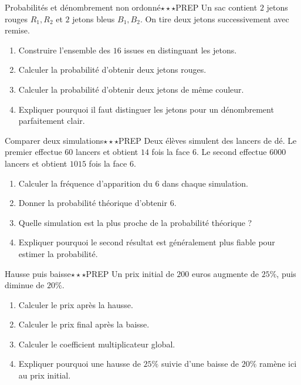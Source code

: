 \documentclass[11pt,a4paper]{article}
\newcounter{exo}
\begin{document}
\begin{exobox}{Probabilités et dénombrement non ordonné}{$\star\star\star$}{PREP}
Un sac contient $2$ jetons rouges $R_1,R_2$ et $2$ jetons bleus $B_1,B_2$. On tire deux jetons successivement avec remise.
\begin{enumerate}
\item Construire l'ensemble des $16$ issues en distinguant les jetons.
\item Calculer la probabilité d'obtenir deux jetons rouges.
\item Calculer la probabilité d'obtenir deux jetons de même couleur.
\item Expliquer pourquoi il faut distinguer les jetons pour un dénombrement parfaitement clair.
\end{enumerate}
\end{exobox}

\begin{exobox}{Comparer deux simulations}{$\star\star\star$}{PREP}
Deux élèves simulent des lancers de dé. Le premier effectue $60$ lancers et obtient $14$ fois la face $6$. Le second effectue $6000$ lancers et obtient $1015$ fois la face $6$.
\begin{enumerate}
\item Calculer la fréquence d'apparition du $6$ dans chaque simulation.
\item Donner la probabilité théorique d'obtenir $6$.
\item Quelle simulation est la plus proche de la probabilité théorique ?
\item Expliquer pourquoi le second résultat est généralement plus fiable pour estimer la probabilité.
\end{enumerate}
\end{exobox}

\begin{exobox}{Hausse puis baisse}{$\star\star\star$}{PREP}
Un prix initial de $200$ euros augmente de $25\%$, puis diminue de $20\%$.
\begin{enumerate}
\item Calculer le prix après la hausse.
\item Calculer le prix final après la baisse.
\item Calculer le coefficient multiplicateur global.
\item Expliquer pourquoi une hausse de $25\%$ suivie d'une baisse de $20\%$ ramène ici au prix initial.
\end{enumerate}
\end{exobox}
\end{document}
